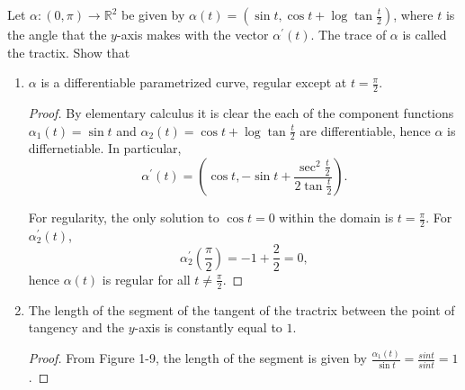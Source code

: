 \documentclass[12pt]{article}
\newenvironment{problem}[2][Problem]{\begin{trivlist}
    \item[\hskip \labelsep {\bfseries #1}\hskip \labelsep {\bfseries #2.}]}{\end{trivlist}}
\theoremstyle{definition}
\begin{document}
\begin{problem}{1.3.4}
	Let \(\alpha: (0, \pi) \rightarrow \mathbb{R}^2 \) be given by \(\alpha(t) = (\sin t, \cos t + \log \tan \frac{t}{2})\), where \( t \) is the angle that the \( y \)-axis makes with the vector \(\alpha^{\prime}(t)\). The trace of \(\alpha\) is called the tractix. Show that \begin{enumerate}[label=(\alph*)]
		\item \(\alpha\) is a differentiable parametrized curve, regular except at \( t = \frac{\pi}{2} \).
		      \begin{proof}
			      By elementary calculus it is clear the each of the component functions \(\alpha_1(t) = \sin t\) and \( \alpha_2(t) = \cos t + \log \tan \frac{t}{2} \) are differentiable, hence \(\alpha\) is differnetiable.
			      In particular,
			      \begin{equation}
				      \alpha^{\prime}(t) = \left(\cos t, -\sin t + \frac{\sec^2\frac{t}{2}}{2\tan \frac{t}{2}}\right).
			      \end{equation}

			      For regularity, the only solution to \( \cos t = 0 \) within the domain is \( t = \frac{\pi}{2} \).
			      For \( \alpha_{2}^{\prime}(t) \),
			      \begin{equation}
				      \label{eq:13}
				      \alpha_2^{\prime}(\frac{\pi}{2}) = -1 + \frac{2}{2} = 0,
			      \end{equation}
			      hence \(\alpha(t)\) is regular for all \( t \neq \frac{\pi}{2} \).
		      \end{proof}
		\item The length of the segment of the tangent of the tractrix between the point of tangency and the \( y \)-axis is constantly equal to \( 1 \).
		      \begin{proof}
			      From Figure 1-9, the length of the segment is given by \( \frac{\alpha_1(t)}{\sin t} = \frac{sin t}{sin t} = 1\).
		      \end{proof}
	\end{enumerate}
\end{problem}
\end{document}
